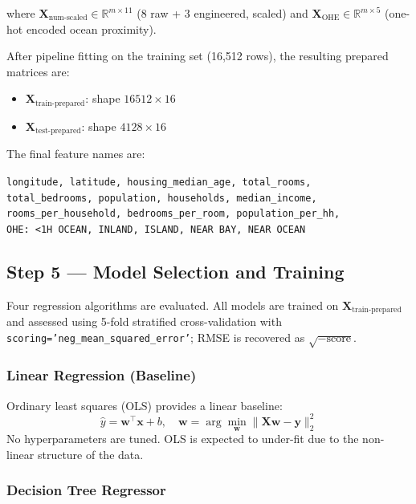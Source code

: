 \documentclass[conference]{IEEEtran}
\begin{document}
where $\mathbf{X}_{\text{num-scaled}} \in \mathbb{R}^{m \times 11}$ (8 raw + 3 engineered, scaled) and $\mathbf{X}_{\text{OHE}} \in \mathbb{R}^{m \times 5}$ (one-hot encoded ocean proximity).

After pipeline fitting on the training set (16,512 rows), the resulting prepared matrices are:
\begin{itemize}
    \item $\mathbf{X}_{\text{train-prepared}}$: shape $16512 \times 16$
    \item $\mathbf{X}_{\text{test-prepared}}$: shape $4128 \times 16$
\end{itemize}

The final feature names are:
\begin{center}
\small
\texttt{longitude, latitude, housing\_median\_age, total\_rooms,\\
total\_bedrooms, population, households, median\_income,\\
rooms\_per\_household, bedrooms\_per\_room, population\_per\_hh,\\
OHE: <1H OCEAN, INLAND, ISLAND, NEAR BAY, NEAR OCEAN}
\end{center}

\subsection{Step 5 — Model Selection and Training}
\label{subsec:models}

Four regression algorithms are evaluated. All models are trained on $\mathbf{X}_{\text{train-prepared}}$ and assessed using 5-fold stratified cross-validation with \texttt{scoring='neg\_mean\_squared\_error'}; RMSE is recovered as $\sqrt{-\text{score}}$.

\subsubsection{Linear Regression (Baseline)}

Ordinary least squares (OLS) provides a linear baseline:
\begin{equation}
    \hat{y} = \mathbf{w}^\top \mathbf{x} + b, \quad \mathbf{w} = \arg\min_{\mathbf{w}} \|\mathbf{X}\mathbf{w} - \mathbf{y}\|_2^2
    \label{eq:ols}
\end{equation}
No hyperparameters are tuned. OLS is expected to under-fit due to the non-linear structure of the data.

\subsubsection{Decision Tree Regressor}
\end{document}

